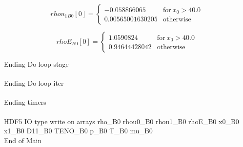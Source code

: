 \documentclass{article}
\begin{document}
\begin{dmath}{rhou_{1}{_{B0}}}[{0}] = \begin{cases} -0.058866065 & \text{for}\: x_{0} > 40.0 \\0.00565001630205 & \text{otherwise} \end{cases}\end{dmath}

\begin{dmath}{rhoE{_{B0}}}[{0}] = \begin{cases} 1.0590824 & \text{for}\: x_{0} > 40.0 \\0.94644428042 & \text{otherwise} \end{cases}\end{dmath}

\noindent Ending Do loop stage\\
\\\noindent Ending Do loop iter\\
\\\noindent Ending timers\\
\\\noindent HDF5 IO type write on arrays rho_B0 rhou0_B0 rhou1_B0 rhoE_B0 x0_B0 x1_B0 D11_B0 TENO_B0 p_B0 T_B0 mu_B0\\\noindent End of Main\\
\end{document}
